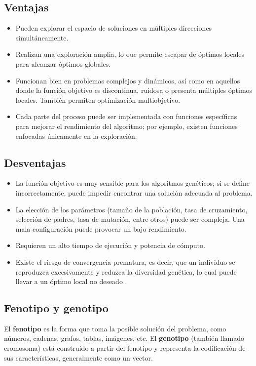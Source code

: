 \subsection{Ventajas}

\begin{itemize}
	\item Pueden explorar el espacio de soluciones en múltiples direcciones simultáneamente.
	\item Realizan una exploración amplia, lo que permite escapar de óptimos locales para alcanzar óptimos globales.
	\item Funcionan bien en problemas complejos y dinámicos, así como en aquellos donde la función objetivo es discontinua, ruidosa o presenta múltiples óptimos locales. También permiten optimización multiobjetivo.
	\item Cada parte del proceso puede ser implementada con funciones específicas para mejorar el rendimiento del algoritmo; por ejemplo, existen funciones enfocadas únicamente en la exploración.
\end{itemize}

\subsection{Desventajas}

\begin{itemize}
	\item La función objetivo es muy sensible para los algoritmos genéticos; si se define incorrectamente, puede impedir encontrar una solución adecuada al problema.
	\item La elección de los parámetros (tamaño de la población, tasa de cruzamiento, selección de padres, tasa de mutación, entre otros) puede ser compleja. Una mala configuración puede provocar un bajo rendimiento.
	\item Requieren un alto tiempo de ejecución y potencia de cómputo.
	\item Existe el riesgo de convergencia prematura, es decir, que un individuo se reproduzca excesivamente y reduzca la diversidad genética, lo cual puede llevar a un óptimo local no deseado \cite{gad}.
\end{itemize}

\subsection{Fenotipo y genotipo}

El \textbf{fenotipo} es la forma que toma la posible solución del problema, como números, cadenas, grafos, tablas, imágenes, etc. El \textbf{genotipo} (también llamado cromosoma) está construido a partir del fenotipo y representa la codificación de sus características, generalmente como un vector.

